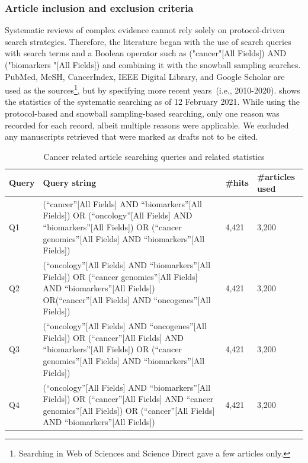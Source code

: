 \subsubsection{Article inclusion and exclusion criteria}
Systematic reviews of complex evidence cannot rely solely on protocol-driven search strategies. Therefore, the literature began with the use of search queries with search terms and a Boolean operator such as ("cancer"[All Fields]) AND ("biomarkers "[All Fields]) and combining it with the snowball sampling searches. PubMed, MeSH, CancerIndex, IEEE Digital Library, and Google Scholar are used as the sources\footnote{Searching in Web of Sciences and Science Direct gave a few articles only.}, but by specifying more recent years~(i.e., 2010-2020).  shows the statistics of the systematic searching as of 12 February 2021. While using the protocol-based and snowball sampling-based searching, only one reason was recorded for each record, albeit multiple reasons were applicable. We excluded any manuscripts retrieved that were marked as drafts not to be cited. 

\begin{table}[h!]
    \centering
    \caption{Cancer related article searching queries and related statistics}
    \label{table:inclusion_exclusion_article}
    \vspace{-2mm}
    \scriptsize{
    \begin{tabular}{p{0.75cm}|p{11cm}|p{0.6cm}|p{2.1cm}} 
        \hline
        \textbf{Query} & \textbf{Query string} & \textbf{\#hits} & \textbf{\#articles used} \\ 
        \hline
        Q1  & (``cancer''[All Fields] AND ``biomarkers''[All Fields]) OR (``oncology''[All Fields] AND ``biomarkers''[All Fields]) OR (``cancer genomics''[All Fields] AND ``biomarkers''[All Fields]) & 4,421 & 3,200 \\ 
        \hline
        Q2  & (``oncology''[All Fields] AND ``biomarkers''[All Fields]) OR (``cancer genomics''[All Fields] AND ``biomarkers”[All Fields]) OR(``cancer''[All Fields] AND ``oncogenes''[All Fields]) & 4,421 & 3,200 \\ 
        \hline
        Q3  & (``oncology''[All Fields] AND ``oncogenes''[All Fields]) OR (``cancer''[All Fields] AND ``biomarkers''[All Fields]) OR (``cancer genomics''[All Fields] AND ``biomarkers''[All Fields]) & 4,421 & 3,200 \\
        \hline
        Q4  & (``oncology''[All Fields] AND ``biomarkers''[All Fields]) OR (``cancer''[All Fields] AND ``cancer genomics''[All Fields]) OR (``cancer''[All Fields] AND ``biomarkers''[All Fields]) & 4,421 & 3,200 \\ 
        \hline
    \end{tabular}}
    \vspace{-4mm}
\end{table}

